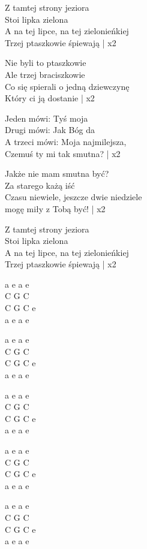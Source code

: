 \begin{text}
    Z tamtej strony jeziora\\
    Stoi lipka zielona\\
    \vin A na tej lipce, na tej zielonieńkiej\\
    \vin Trzej ptaszkowie śpiewają | x2

    Nie byli to ptaszkowie\\
    Ale trzej braciszkowie\\
    \vin Co się spierali o jedną dziewczynę\\
    \vin Który ci ją dostanie | x2

    Jeden mówi: Tyś moja\\
    Drugi mówi: Jak Bóg da\\
    \vin A trzeci mówi: Moja najmilejsza,\\
    \vin Czemuś ty mi tak smutna? | x2

    Jakże nie mam smutna być?\\
    Za starego każą iść\\
    \vin Czasu niewiele, jeszcze dwie niedziele\\
    \vin mogę miły z Tobą być! | x2

    Z tamtej strony jeziora\\
    Stoi lipka zielona\\
    \vin A na tej lipce, na tej zielonieńkiej\\
    \vin Trzej ptaszkowie śpiewają | x2
\end{text}
\begin{chord}
    a e a e\\
    C G C\\
    C G C e\\
    a e a e
    
    a e a e\\
    C G C\\
    C G C e\\
    a e a e
    
    a e a e\\
    C G C\\
    C G C e\\
    a e a e
    
    a e a e\\
    C G C\\
    C G C e\\
    a e a e
    
    a e a e\\
    C G C\\
    C G C e\\
    a e a e
\end{chord}